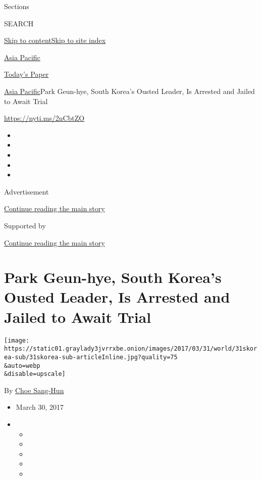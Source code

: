 Sections

SEARCH

\protect\hyperlink{site-content}{Skip to
content}\protect\hyperlink{site-index}{Skip to site index}

\href{https://www.nytimes3xbfgragh.onion/section/world/asia}{Asia
Pacific}

\href{https://myaccount.nytimes3xbfgragh.onion/auth/login?response_type=cookie\&client_id=vi}{}

\href{https://www.nytimes3xbfgragh.onion/section/todayspaper}{Today's
Paper}

\href{/section/world/asia}{Asia Pacific}\textbar{}Park Geun-hye, South
Korea's Ousted Leader, Is Arrested and Jailed to Await Trial

\url{https://nyti.ms/2nCbtZO}

\begin{itemize}
\item
\item
\item
\item
\item
\end{itemize}

Advertisement

\protect\hyperlink{after-top}{Continue reading the main story}

Supported by

\protect\hyperlink{after-sponsor}{Continue reading the main story}

\hypertarget{park-geun-hye-south-koreas-ousted-leader-is-arrested-and-jailed-to-await-trial}{%
\section{Park Geun-hye, South Korea's Ousted Leader, Is Arrested and
Jailed to Await
Trial}\label{park-geun-hye-south-koreas-ousted-leader-is-arrested-and-jailed-to-await-trial}}

\texttt{[image: https://static01.graylady3jvrrxbe.onion/images/2017/03/31/world/31skorea-sub/31skorea-sub-articleInline.jpg?quality=75\\\&auto=webp\\\&disable=upscale]}

By \href{http://www.nytimes3xbfgragh.onion/by/choe-sang-hun}{Choe
Sang-Hun}

\begin{itemize}
\item
  March 30, 2017
\item
  \begin{itemize}
  \item
  \item
  \item
  \item
  \item
  \end{itemize}
\end{itemize}

